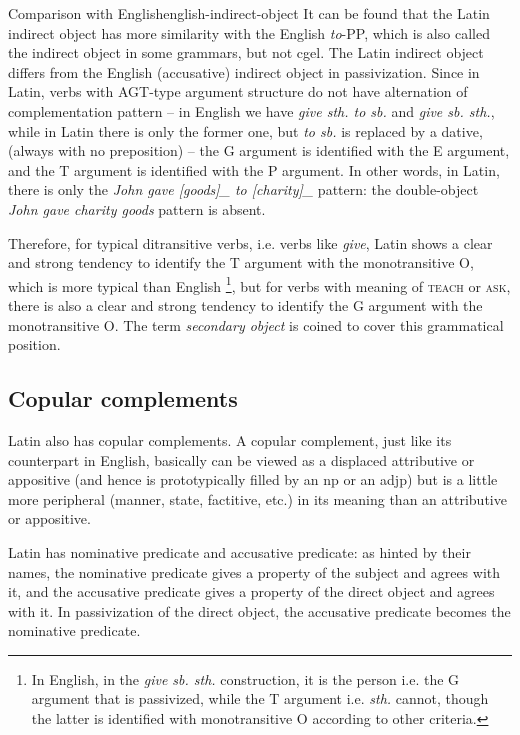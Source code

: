 \documentclass[a4paper, oneside, 12pt]{report}
\newcommand*{\term}[1]{\emph{#1}}
\newcommand{\form}[1]{\emph{#1}}
\newcommand*{\category}[1]{\textsc{#1}}
\begin{document}
\begin{infobox}{Comparison with English}{english-indirect-object}
    It can be found that the Latin indirect object has more similarity with the English \form{to}-PP,
    which is also called the indirect object in some grammars, but not \ac{cgel}.
    The Latin indirect object differs from the English (accusative) indirect object in passivization.
    Since in Latin, verbs with AGT-type argument structure do not have alternation of complementation pattern
    -- in English we have \form{give sth. to sb.} and \form{give sb. sth.}, 
    while in Latin there is only the former one, but \form{to sb.} is replaced by a dative,
    (always with no preposition) --
    the G argument is identified with the E argument,
    and the T argument is identified with the P argument.
    In other words, in Latin, there is only 
    the \form{John gave [goods]_{} to [charity]_{}} pattern:
    the double-object \form{John gave charity goods} pattern is absent.
    
    Therefore, for typical ditransitive verbs, i.e. verbs like \form{give}, 
    Latin shows a clear and strong tendency to identify the T argument with the monotransitive O,
    which is more typical than English%
    \footnote{
        In English, in the \form{give sb. sth.} construction, it is the person i.e. the G argument that is passivized,
        while the T argument i.e. \form{sth.} cannot, though the latter is identified with monotransitive O
        according to other criteria. 
    },
    but for verbs with meaning of \category{teach} or \category{ask},
    there is also a clear and strong tendency to identify the G argument with the monotransitive O.
    The term \term{secondary object} is coined to cover this grammatical position.
\end{infobox}

\subsection{Copular complements}

Latin also has copular complements.
A copular complement, just like its counterpart in English,
basically can be viewed as a displaced attributive or appositive 
(and hence is prototypically filled by an \ac{np} or an \acs{adjp})
but is a little more peripheral (manner, state, factitive, etc.) 
in its meaning than an attributive or appositive.

Latin has nominative predicate and accusative predicate:
as hinted by their names, 
the nominative predicate gives a property of the subject and agrees with it,
and the accusative predicate gives a property of the direct object and agrees with it.
In passivization of the direct object,
the accusative predicate becomes the nominative predicate.
\end{document}
